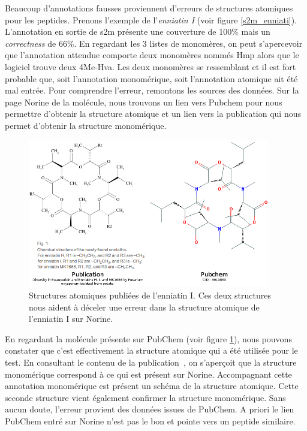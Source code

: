 Beaucoup d'annotations fausses proviennent d'erreurs de structures atomiques pour les peptides.
Prenons l'exemple de l'\textit{enniatin I} (voir figure \ref{s2m_enniati}).
L'annotation en sortie de s2m présente une couverture de 100\% mais un \textit{correctness} de 66\%.
En regardant les 3 listes de monomères, on peut s'apercevoir que l'annotation attendue comporte deux monomères nommés Hmp alors que le logiciel trouve deux 4Me-Hva.
Les deux monomères se ressemblant et il est fort probable que, soit l'annotation monomérique, soit l'annotation atomique ait été mal entrée.
Pour comprendre l'erreur, remontons les sources des données.
Sur la page Norine de la molécule, nous trouvons un lien vers Pubchem pour nous permettre d'obtenir la structure atomique et un lien vers la publication qui nous permet d'obtenir la structure monomérique.

\begin{figure}[h!]
  \begin{center}
    \includegraphics[width=400px]{Figures/s2m/results/enniatinI_corrections.png}
    \caption{\label{enni_cor}Structures atomiques publiées de l'enniatin I.
    Ces deux structures nous aident à déceler une erreur dans la structure atomique de l'enniatin I sur Norine.}
  \end{center}
\end{figure}

En regardant la molécule présente sur PubChem (voir figure \ref{enni_cor}), nous pouvons constater que c'est effectivement la structure atomique qui a été utilisée pour le test.
En consultant le contenu de la publication~\cite{song_diversity_2008}, on s'aperçoit que la structure monomérique correspond à ce qui est présent sur Norine.
Accompagnant cette annotation monomérique est présent un schéma de la structure atomique.
Cette seconde structure vient également confirmer la structure monomérique.
Sans aucun doute, l'erreur provient des données issues de PubChem.
A priori le lien PubChem entré sur Norine n'est pas le bon et pointe vers un peptide similaire.

